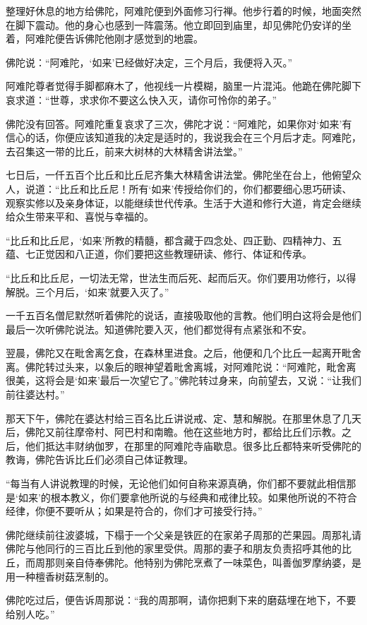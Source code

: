 \documentclass[12pt,twoside,openany]{book}
\begin{document}
整理好休息的地方给佛陀，阿难陀便到外面修习行禅。他步行着的时候，地面突然在脚下震动。他的身心也感到一阵震荡。他立即回到庙里，却见佛陀仍安详的坐着，阿难陀便告诉佛陀他刚才感觉到的地震。

佛陀说：“阿难陀，‘如来’已经做好决定，三个月后，我便将入灭。”

阿难陀尊者觉得手脚都麻木了，他视线一片模糊，脑里一片混沌。他跪在佛陀脚下哀求道：“世尊，求求你不要这么快入灭，请你可怜你的弟子。”

佛陀没有回答。阿难陀重复哀求了三次，佛陀才说：“阿难陀，如果你对‘如来’有信心的话，你便应该知道我的决定是适时的，我说我会在三个月后才走。阿难陀，去召集这一带的比丘，前来大树林的大林精舍讲法堂。”

七日后，一仟五百个比丘和比丘尼齐集大林精舍讲法堂。佛陀坐在台上，他俯望众人，说道：“比丘和比丘尼！所有‘如来’传授给你们的，你们都要细心思巧研读、观察实修以及亲身体证，以能继续世代传承。生活于大道和修行大道，肯定会继续给众生带来平和、喜悦与幸福的。

“比丘和比丘尼，‘如来’所教的精髓，都含藏于四念处、四正勤、四精神力、五蕴、七正觉因和八正道，你们要把这些教理研读、修行、体证和传承。

“比丘和比丘尼，一切法无常，世法生而后死、起而后灭。你们要用功修行，以得解脱。三个月后，‘如来’就要入灭了。”

一千五百名僧尼默然听着佛陀的说话，直接吸取他的言教。他们明白这将会是他们最后一次听佛陀说法。知道佛陀要入灭，他们都觉得有点紧张和不安。

翌晨，佛陀又在毗舍离乞食，在森林里进食。之后，他便和几个比丘一起离开毗舍离。佛陀转过头来，以象后的眼神望着毗舍离城，对阿难陀说：“阿难陀，毗舍离很美，这将会是‘如来’最后一次望它了。”佛陀转过身来，向前望去，又说：“让我们前往婆达村。”

那天下午，佛陀在婆达村给三百名比丘讲说戒、定、慧和解脱。在那里休息了几天后，佛陀又前往摩帝村、阿巴村和南瞻。他在这些地方时，都给比丘们示教。之后，他们抵达丰财纳伽罗，在那里的阿难陀寺庙歇息。很多比丘都特来听受佛陀的教诲，佛陀告诉比丘们必须自己体证教理。

“每当有人讲说教理的时候，无论他们如何自称来源真确，你们都不要就此相信那是‘如来’的根本教义，你们要拿他所说的与经典和戒律比较。如果他所说的不符合经律，你便不要听从；如果是符合的，你们才可接受行持。”

佛陀继续前往波婆城，下榻于一个父亲是铁匠的在家弟子周那的芒果园。周那礼请佛陀与他同行的三百比丘到他的家里受供。周那的妻子和朋友负责招呼其他的比丘，而周那则亲自侍奉佛陀。他特别为佛陀烹煮了一味菜色，叫善伽罗摩纳婆，是用一种檀香树菇烹制的。

佛陀吃过后，便告诉周那说：“我的周那啊，请你把剩下来的磨菇埋在地下，不要给别人吃。”
\end{document}
